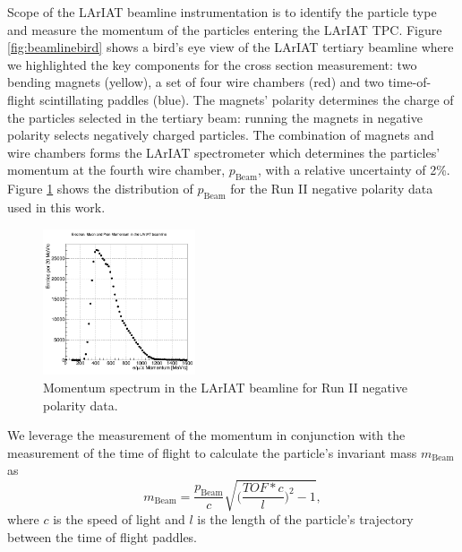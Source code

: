 \documentclass[aps,prl,twocolumn,showpacs,superscriptaddress,groupedaddress]{revtex4}  %
\begin{document}


Scope of the LArIAT beamline instrumentation is to identify the particle type and measure the momentum of the particles entering the LArIAT TPC. Figure \ref{fig:beamlinebird} shows a bird's eye view of the LArIAT tertiary beamline where we highlighted the key components for the cross section measurement:  two bending magnets (yellow), a set of four wire chambers (red) and two time-of-flight scintillating paddles (blue).  The magnets' polarity determines the charge of the particles selected in the tertiary beam: running the magnets in negative polarity selects negatively charged particles. The combination of magnets and wire chambers forms the LArIAT spectrometer which determines the particles' momentum at the fourth wire chamber, $p_{\text{Beam}}$, with a relative uncertainty of 2\%. Figure \ref{fig:momentum} shows the distribution of  $p_{\text{Beam}}$ for the Run II negative polarity data used in this work. 
\begin{figure}
  \centering  
\includegraphics[width =0.4\textwidth]{momentumPiMuE.png}
\caption{Momentum spectrum in the LArIAT beamline  for Run II negative polarity data.}
\label{fig:momentum}
\end{figure}



We leverage the measurement of the momentum in conjunction with the measurement of the time of flight to calculate the particle's invariant mass $m_{\text{Beam}}$ as 
\begin{equation}
m_{\text{Beam}} = \frac{p_{\text{Beam}}}{c}\sqrt{\biggl(\frac{TOF*c}{l}\biggr)^2 -1},
\label{eq:mass}
\end{equation}
 where $c$ is the speed of light and $l$ is the length of the particle's trajectory between the time of flight paddles. 
\end{document}
